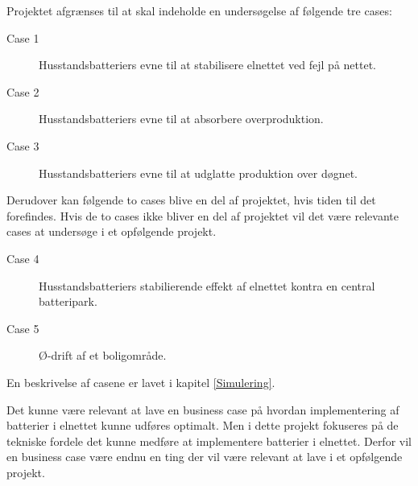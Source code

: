 
\label{Afgraensning}

Projektet afgrænses til at skal indeholde en undersøgelse af følgende tre cases:

\begin{description}
	\item[Case 1] Husstandsbatteriers evne til at stabilisere elnettet ved fejl på nettet.
	\item[Case 2] Husstandsbatteriers evne til at absorbere overproduktion.
	\item[Case 3] Husstandsbatteriers evne til at udglatte produktion over døgnet.
\end{description}	
	
Derudover kan følgende to cases blive en del af projektet, hvis tiden til det forefindes. Hvis de to cases ikke bliver en del af projektet vil det være relevante cases at undersøge i et opfølgende projekt.

\begin{description}
	\item[Case 4] Husstandsbatteriers stabilierende effekt af elnettet kontra en central batteripark.
	\item[Case 5] Ø-drift af et boligområde.
\end{description}

En beskrivelse af casene er lavet i kapitel \ref{Simulering}.

Det kunne være relevant at lave en business case på hvordan implementering af batterier i elnettet kunne udføres optimalt. Men i dette projekt fokuseres på de tekniske fordele det kunne medføre at implementere batterier i elnettet. Derfor vil en business case være endnu en ting der vil være relevant at lave i et opfølgende projekt.